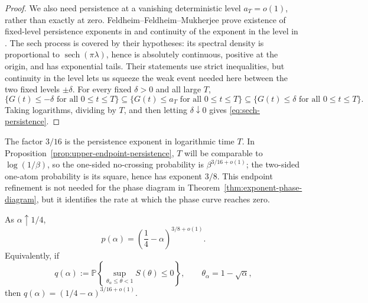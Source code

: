 \begin{proof}
We also need persistence at a vanishing deterministic level
\(a_T=o(1)\), rather than exactly at zero.
Feldheim--Feldheim--Mukherjee prove existence of fixed-level persistence
exponents in \cite[Theorem~1]{FeldheimFeldheimMukherjee2025} and continuity of
the exponent in the level in \cite[Theorem~4(II)]{FeldheimFeldheimMukherjee2025}.
The sech process is covered by their hypotheses: its spectral density is
proportional to \(\operatorname{sech}(\pi\lambda)\), hence is absolutely
continuous, positive at the origin, and has exponential tails. Their statements
use strict inequalities, but continuity in the level lets us squeeze the weak
event needed here between the two fixed levels \(\pm\delta\). For every fixed
\(\delta>0\) and all large \(T\),
\[
    \{G(t)\le-\delta\text{ for all }0\le t\le T\}
    \subseteq
    \{G(t)\le a_T\text{ for all }0\le t\le T\}
    \subseteq
    \{G(t)\le\delta\text{ for all }0\le t\le T\}.
\]
Taking logarithms, dividing by $T$, and then letting $\delta\downarrow0$ gives \eqref{eq:sech-persistence}.
\end{proof}

The factor $3/16$ is the persistence exponent in logarithmic time $T$. In Proposition~\ref{prop:upper-endpoint-persistence}, $T$ will be comparable to $\log(1/\beta)$, so the one-sided no-crossing probability is $\beta^{3/16+o(1)}$; the two-sided one-atom probability is its square, hence has exponent $3/8$. This endpoint refinement is not needed for the phase diagram in Theorem~\ref{thm:exponent-phase-diagram}, but it identifies the rate at which the phase curve reaches zero.

\begin{proposition}
\label{prop:upper-endpoint-persistence}
As \(\alpha\uparrow1/4\),
\[
    p(\alpha)
    =
    \left(\frac14-\alpha\right)^{3/8+o(1)}
    .
\]
Equivalently, if
\[
    q(\alpha)
    :=
    \mathbb P\left\{
        \sup_{\theta_\alpha\le\theta<1}S(\theta)\le0
    \right\},
    \qquad
    \theta_\alpha=1-\sqrt\alpha,
\]
then $q(\alpha)=(1/4-\alpha)^{3/16+o(1)}$.
\end{proposition}

